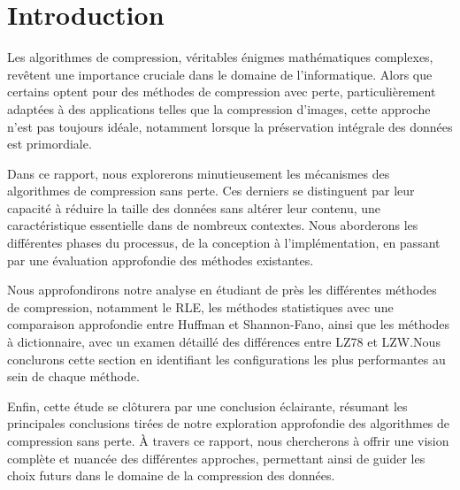 \section{Introduction}

Les algorithmes de compression, véritables énigmes mathématiques complexes, revêtent une importance cruciale dans le domaine de l'informatique. Alors que certains optent pour des méthodes de compression avec perte, particulièrement adaptées à des applications telles que la compression d'images, cette approche n'est pas toujours idéale, notamment lorsque la préservation intégrale des données est primordiale.

\bigskip

Dans ce rapport, nous explorerons minutieusement les mécanismes des algorithmes de compression sans perte. Ces derniers se distinguent par leur capacité à réduire la taille des données sans altérer leur contenu, une caractéristique essentielle dans de nombreux contextes. Nous aborderons les différentes phases du processus, de la conception à l'implémentation, en passant par une évaluation approfondie des méthodes existantes.

\bigskip

Nous approfondirons notre analyse en étudiant de près les différentes méthodes de compression, notamment le RLE, les méthodes statistiques avec une comparaison approfondie entre Huffman et Shannon-Fano, ainsi que les méthodes à dictionnaire, avec un examen détaillé des différences entre LZ78 et LZW.\@ Nous conclurons cette section en identifiant les configurations les plus performantes au sein de chaque méthode.

\medskip

Enfin, cette étude se clôturera par une conclusion éclairante, résumant les principales conclusions tirées de notre exploration approfondie des algorithmes de compression sans perte. À travers ce rapport, nous chercherons à offrir une vision complète et nuancée des différentes approches, permettant ainsi de guider les choix futurs dans le domaine de la compression des données.